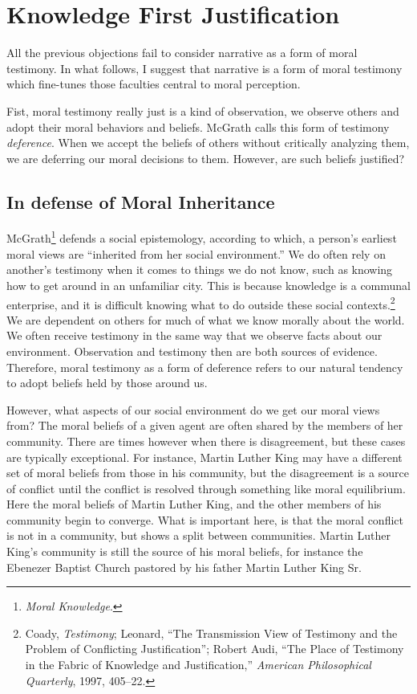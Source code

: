 \documentclass[phdthesis,12pt,final]{wuthesis}
\theoremstyle{definition}
\theoremstyle{definition}
\theoremstyle{definition}
\theoremstyle{definition}
\theoremstyle{remark}
\begin{document}
\section{Knowledge First Justification}\label{knowledge-first-justification-1}

All the previous objections fail to consider narrative as a form of moral testimony. In what follows, I suggest that narrative is a form of moral testimony which fine-tunes those faculties central to moral perception.

Fist, moral testimony really just is a kind of observation, we observe others and adopt their moral behaviors and beliefs. McGrath calls this form of testimony \emph{deference}. When we accept the beliefs of others without critically analyzing them, we are deferring our moral decisions to them. However, are such beliefs justified?

\subsection*{In defense of Moral Inheritance}\label{in-defense-of-moral-inheritance-1}

McGrath\footnote{\emph{Moral {Knowledge}}.} defends a social epistemology, according to which, a person's earliest moral views are ``inherited from her social environment.'' We do often rely on another's testimony when it comes to things we do not know, such as knowing how to get around in an unfamiliar city. This is because knowledge is a communal enterprise, and it is difficult knowing what to do outside these social contexts.\footnote{Coady, \emph{Testimony}; Leonard, {``The {Transmission View} of {Testimony} and the {Problem} of {Conflicting Justification}''}; Robert Audi, {``The {Place} of {Testimony} in the {Fabric} of {Knowledge} and {Justification},''} \emph{American Philosophical Quarterly}, 1997, 405--22.} We are dependent on others for much of what we know morally about the world. We often receive testimony in the same way that we observe facts about our environment. Observation and testimony then are both sources of evidence. Therefore, moral testimony as a form of deference refers to our natural tendency to adopt beliefs held by those around us.

However, what aspects of our social environment do we get our moral views from? The moral beliefs of a given agent are often shared by the members of her community. There are times however when there is disagreement, but these cases are typically exceptional. For instance, Martin Luther King may have a different set of moral beliefs from those in his community, but the disagreement is a source of conflict until the conflict is resolved through something like moral equilibrium. Here the moral beliefs of Martin Luther King, and the other members of his community begin to converge. What is important here, is that the moral conflict is not in a community, but shows a split between communities. Martin Luther King's community is still the source of his moral beliefs, for instance the Ebenezer Baptist Church pastored by his father Martin Luther King Sr.
\end{document}
